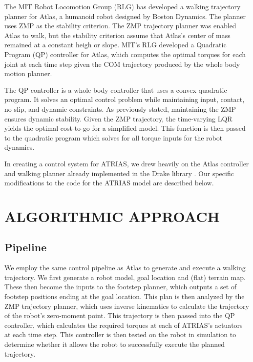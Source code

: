 \documentclass[letterpaper, 10 pt, conference]{ieeeconf}  %
\begin{document}
The MIT Robot Locomotion Group (RLG) has developed a walking trajectory planner for Atlas, a humanoid robot designed by Boston Dynamics. The planner uses ZMP as ​the stability criterion. The ZMP trajectory planner was enabled Atlas to walk, but the stability criterion assume that Atlas's center of mass remained at a constant heigh or slope. \cite{dai14} MIT's RLG developed a Quadratic Program (QP) controller for Atlas, which computes the optimal torques for each joint at each time step given the COM trajectory produced by the whole body motion planner. \cite{kuindersma13}

The QP controller is a whole-body controller that uses a convex quadratic program. It solves an optimal control problem while maintaining input, contact, no-slip, and dynamic constraints. As previously stated, maintaining the ZMP ensures dynamic stability. Given the ZMP trajectory, the time-varying LQR yields the optimal cost-to-go for a simplified model. This function is then passed to the quadratic program which solves for all torque inputs for the robot dynamics.

In creating a control system for ATRIAS, we drew heavily on the Atlas controller and walking planner already implemented in the Drake library \cite{c1}. Our specific modifications to the code for the ATRIAS model are described below.

\section{ALGORITHMIC APPROACH}

\subsection{Pipeline}

We employ the same control pipeline as Atlas to generate and execute a walking trajectory. We first generate a robot model, goal location and (flat) terrain map. These then become the inputs to the footstep planner, which outputs a set of footstep positions ending at the goal location. This plan is then analyzed by the ZMP trajectory planner, which uses inverse kinematics to calculate the trajectory of the robot’s zero-moment point. This trajectory is then passed into the QP controller, which calculates the required torques at each of ATRIAS’s actuators at each time step. This controller is then tested on the robot in simulation to determine whether it allows the robot to successfully execute the planned trajectory. \cite{dai14}\cite{deits14}
\end{document}
